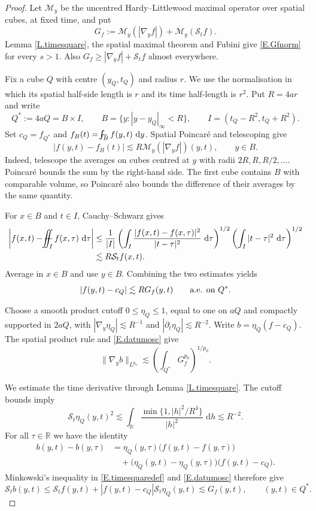 \documentclass[12pt,leqno]{amsart}
\numberwithin{equation}{section}
\newcommand{\R}{\mathbb R}
\newcommand{\pd}{\partial}
\renewcommand{\d}{\,\mathrm d}
\def\Yint#1{\mathchoice
	{\YYint\displaystyle\textstyle{#1}}%
	{\YYint\textstyle\scriptstyle{#1}}%
	{\YYint\scriptstyle\scriptscriptstyle{#1}}%
	{\YYint\scriptscriptstyle\scriptscriptstyle{#1}}%
	\!\dint}
\newcommand{\dint}{\int\!\!\!\!\!\int}
\def\YYint#1#2#3{{\setbox0=\hbox{$#1{#2#3}{\iint}$}
		\vcenter{\hbox{$#2#3$}}\kern-.51\wd0}}
\def\longdash{\mkern-1.5mu{-}\mkern-7.5mu{-}}
\def\fiint{\Yint\longdash}
\theoremstyle{plain}
\theoremstyle{remark}
\begin{document}
\begin{proof}
Let $\mathcal M_y$ be the uncentred Hardy--Littlewood maximal operator
over spatial cubes, at fixed time, and put
\[
 G_f:=\mathcal M_y(|\nabla_y f|)+\mathcal M_y(\mathcal S_t f).
\]
Lemma \ref{L.timesquare}, the spatial maximal theorem and Fubini give
\eqref{E.Gfnorm} for every $s>1$. Also
$G_f\ge|\nabla_y f|+\mathcal S_t f$ almost everywhere.

Fix a cube $Q$ with centre $(y_Q,t_Q)$ and radius $r$. We use the
normalisation in which its spatial half-side length is $r$ and its time
half-length is $r^2$. Put $R=4ar$ and write
\[
 Q^*:=4aQ=B\times I,\qquad
 B=\{y:|y-y_Q|_\infty<R\},\qquad
 I=(t_Q-R^2,t_Q+R^2).
\]
Set $c_Q=f_{Q^*}$ and $f_B(t)=\fiint_B f(y,t)\,\d y$.
Spatial Poincar\'e and telescoping give
\[
 |f(y,t)-f_B(t)|\lesssim R\mathcal M_y(|\nabla_y f|)(y,t),
 \qquad y\in B.
\]
Indeed, telescope the averages on cubes centred at $y$ with radii
$2R,R,R/2,\ldots$. Poincar\'e bounds the sum by the right-hand side.
The first cube contains $B$ with comparable volume, so Poincar\'e also
bounds the difference of their averages by the same quantity.

For $x\in B$ and $t\in I$, Cauchy--Schwarz gives
\begin{align*}
 \left|f(x,t)-\fiint_I f(x,\tau)\,\d\tau\right|
 &\le \frac1{|I|}
 \left(\int_I\frac{|f(x,t)-f(x,\tau)|^2}{|t-\tau|^2}\,\d\tau\right)^{1/2}
 \left(\int_I|t-\tau|^2\,\d\tau\right)^{1/2}\\
 &\lesssim R\mathcal S_t f(x,t).
\end{align*}
Average in $x\in B$ and use $y\in B$. Combining the two estimates yields
\begin{equation}\label{E.datumosc}
 |f(y,t)-c_Q|\lesssim R G_f(y,t)
 \qquad\hbox{a.e. on }Q^*.
\end{equation}

Choose a smooth product cutoff $0\le\eta_Q\le1$, equal to one on $aQ$
and compactly supported in $2aQ$, with
$|\nabla_y\eta_Q|\lesssim R^{-1}$ and
$|\pd_t\eta_Q|\lesssim R^{-2}$. Write $b=\eta_Q(f-c_Q)$.
The spatial product rule and \eqref{E.datumosc} give
\begin{equation}\label{E.datumspatial}
 \|\nabla_y b\|_{L^{p_0}}
 \lesssim\left(\int_{Q^*}G_f^{p_0}\right)^{1/p_0}.
\end{equation}

We estimate the time derivative through Lemma \ref{L.timesquare}.
The cutoff bounds imply
\[
 \mathcal S_t\eta_Q(y,t)^2
 \lesssim\int_\R\frac{\min\{1,|h|^2/R^4\}}{|h|^2}\,\d h
 \lesssim R^{-2}.
\]
For all $\tau\in\R$ we have the identity
\begin{align*}
 b(y,t)-b(y,\tau)
 &=\eta_Q(y,\tau)\big(f(y,t)-f(y,\tau)\big)\\
 &\quad+\big(\eta_Q(y,t)-\eta_Q(y,\tau)\big)\big(f(y,t)-c_Q\big).
\end{align*}
Minkowski's inequality in \eqref{E.timesquaredef} and \eqref{E.datumosc}
therefore give
\begin{equation}\label{E.datumlocaltime}
 \mathcal S_t b(y,t)
 \le\mathcal S_t f(y,t)+|f(y,t)-c_Q|\mathcal S_t\eta_Q(y,t)
 \lesssim G_f(y,t),\qquad (y,t)\in Q^*.
\end{equation}


\end{proof}
\end{document}
